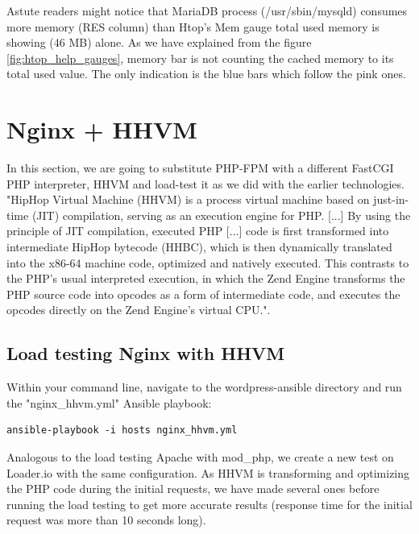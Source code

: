 Astute readers might notice that MariaDB process (/usr/sbin/mysqld) consumes more memory (RES column) than Htop's Mem gauge total used memory is showing (46 MB) alone. As we have explained from the figure \ref{fig:htop_help_gauges}, memory bar is not counting the cached memory to its total used value. The only indication is the blue bars which follow the pink ones.

\section{Nginx + HHVM}

In this section, we are going to substitute PHP-FPM with a different FastCGI PHP interpreter, HHVM and load-test it as we did with the earlier technologies. \\

"HipHop Virtual Machine (HHVM) is a process virtual machine based on just-in-time (JIT) compilation, serving as an execution engine for PHP. [...] By using the principle of JIT compilation, executed PHP [...] code is first transformed into intermediate HipHop bytecode (HHBC), which is then dynamically translated into the x86-64 machine code, optimized and natively executed. This contrasts to the PHP's usual interpreted execution, in which the Zend Engine transforms the PHP source code into opcodes as a form of intermediate code, and executes the opcodes directly on the Zend Engine's virtual CPU.". \cite{HHVM:Wiki} \\

\subsection{Load testing Nginx with HHVM}

Within your command line, navigate to the wordpress-ansible directory and run the "nginx\_hhvm.yml" Ansible playbook:

\begin{lstlisting}
ansible-playbook -i hosts nginx_hhvm.yml
\end{lstlisting}

Analogous to the load testing Apache with mod\_php, we create a new test on Loader.io with the same configuration. \cite{Loader.io:nginx_hhvm} As HHVM is transforming and optimizing the PHP code during the initial requests, we have made several ones before running the load testing to get more accurate results (response time for the initial request was more than 10 seconds long).

